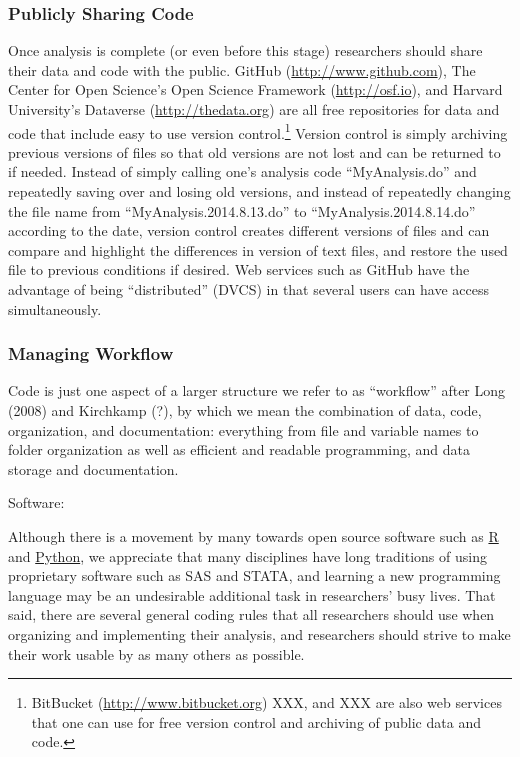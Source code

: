 \documentclass[12pt] {article}
\begin{document}
\subsubsection{Publicly Sharing Code}\label{publicly-sharing-code}

Once analysis is complete (or even before this stage) researchers should
share their data and code with the public. GitHub
(\url{http://www.github.com}), The Center for Open Science's Open
Science Framework (\url{http://osf.io}), and Harvard University's
Dataverse (\url{http://thedata.org}) are all free repositories for data
and code that include easy to use version control.\footnote{BitBucket
  (\href{styles.xml}{http://www.bitbucket.org}) XXX, and XXX are also
  web services that one can use for free version control and archiving
  of public data and code.} Version control is simply archiving previous
versions of files so that old versions are not lost and can be returned
to if needed. Instead of simply calling one's analysis code
``MyAnalysis.do'' and repeatedly saving over and losing old versions,
and instead of repeatedly changing the file name from
``MyAnalysis.2014.8.13.do'' to ``MyAnalysis.2014.8.14.do'' according to
the date, version control creates different versions of files and can
compare and highlight the differences in version of text files, and
restore the used file to previous conditions if desired. Web services
such as GitHub have the advantage of being ``distributed'' (DVCS) in
that several users can have access simultaneously.

\subsubsection{Managing Workflow}\label{managing-workflow}

Code is just one aspect of a larger structure we refer to as
``workflow'' after Long (2008) and Kirchkamp (?), by which we mean the
combination of data, code, organization, and documentation: everything
from file and variable names to folder organization as well as efficient
and readable programming, and data storage and documentation.

Software:

Although there is a movement by many towards open source software such
as \href{http://www.r-project.org/}{R} and \href{https://www.python.org/}{Python}, we appreciate that many disciplines have long
traditions of using proprietary software such as SAS and STATA, and
learning a new programming language may be an undesirable additional
task in researchers' busy lives. That said, there are several general
coding rules that all researchers should use when organizing and
implementing their analysis, and researchers should strive to make their
work usable by as many others as possible.
\end{document}
